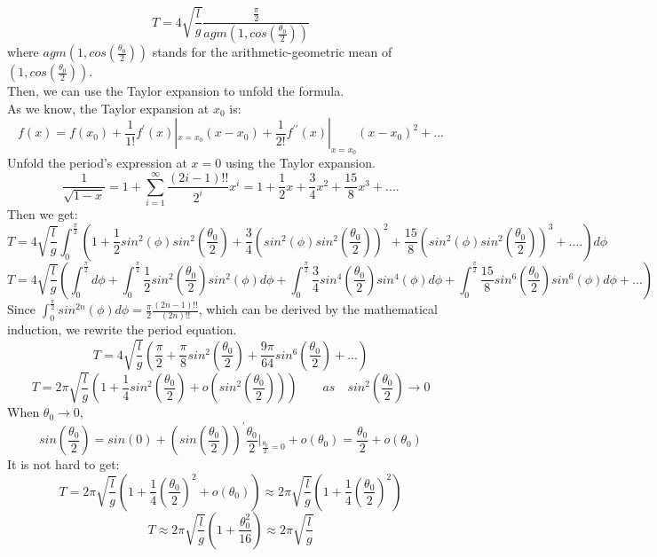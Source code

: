 \documentclass[12pt,a4paper]{article}
\begin{document}
\begin{equation}
T=4\sqrt{\frac{l}{g}}\frac{\frac{\pi}{2}}{agm(1,cos(\frac{\theta_0}{2}))}
\end{equation}
where $agm(1,cos(\frac{\theta_0}{2}))$ stands for the arithmetic-geometric mean of $(1,cos(\frac{\theta_0}{2}))$.\\
Then, we can use the Taylor expansion to unfold the formula.\\
As we know, the Taylor expansion at $x_0$ is:
$$f(x)=f(x_0)+\frac{1}{1!}f^\prime(x)|_{x=x_0}(x-x_0)+\frac{1}{2!}f^{\prime \prime}(x)|_{x=x_0}(x-x_0)^2+...$$
Unfold the period's expression at $x=0$ using the Taylor expansion.
$$\frac{1}{\sqrt{1-x}}=1+\sum_{i=1}^{\infty}\frac{(2i-1)!!}{2^i}x^i=1+\frac{1}{2}x+\frac{3}{4}x^2+\frac{15}{8}x^3+....$$
Then we get:
$$T=4\sqrt{\frac{l}{g}}\int_0^{\frac{\pi}{2}}(1+\frac{1}{2}sin^2(\phi)sin^2(\frac{\theta_0}{2})+\frac{3}{4}(sin^2(\phi)sin^2(\frac{\theta_0}{2}))^2+\frac{15}{8}(sin^2(\phi)sin^2(\frac{\theta_0}{2}))^3+....)d\phi$$
$$T=4\sqrt{\frac{l}{g}}(\int_0^{\frac{\pi}{2}}d\phi+\int_0^{\frac{\pi}{2}}\frac{1}{2}sin^2(\frac{\theta_0}{2})sin^2(\phi)d\phi+\int_0^{\frac{\pi}{2}}\frac{3}{4}sin^4(\frac{\theta_0}{2})sin^4(\phi)d\phi+\int_0^{\frac{\pi}{2}}\frac{15}{8}sin^6(\frac{\theta_0}{2})sin^6(\phi)d\phi+...)$$
Since $\int_0^{\frac{\pi}{2}}sin^{2n}(\phi)d\phi=\frac{\pi}{2}\frac{(2n-1)!!}{(2n)!!}$, which can be derived by the mathematical induction, we rewrite the period equation.
$$T=4\sqrt{\frac{l}{g}}(\frac{\pi}{2}+\frac{\pi}{8}sin^2(\frac{\theta_0}{2})+\frac{9\pi}{64}sin^6(\frac{\theta_0}{2})+...)$$
$$T=2\pi\sqrt{\frac{l}{g}}(1+\frac{1}{4}sin^2(\frac{\theta_0}{2})+o(sin^2(\frac{\theta_0}{2})))\qquad as\quad sin^2(\frac{\theta_0}{2})\rightarrow 0$$
When $\theta_{0}\rightarrow 0$, $$sin(\frac{\theta_0}{2})=sin(0)+(sin(\frac{\theta_0}{2}))^\prime\frac{\theta_0}{2}|_{\frac{\theta_0}{2}=0}+o({\theta_0})=\frac{\theta_0}{2}+o({\theta_0})$$
It is not hard to get:
$$T=2\pi\sqrt{\frac{l}{g}}(1+\frac{1}{4}(\frac{\theta_0}{2})^2+o(\theta_0))\approx2\pi\sqrt{\frac{l}{g}}(1+\frac{1}{4}(\frac{\theta_0}{2})^2)$$
\begin{equation}
T\approx2\pi\sqrt{\frac{l}{g}}(1+\frac{\theta_0^2}{16})\approx2\pi\sqrt{\frac{l}{g}}
\end{equation}
\end{document}
